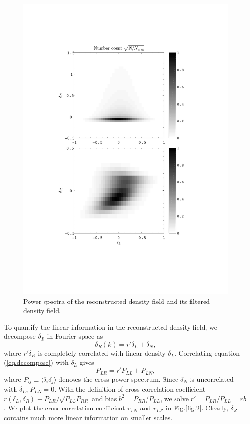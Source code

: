 \documentclass[aps,prd,twocolumn,superscriptaddress,amsfont,amssymb,amsmath,nofootinbib,showpacs,balancelastpage]{revtex4-1}
\begin{document}
\begin{figure}[t] \centering
  \includegraphics[width=1.0\linewidth]{pdfs.pdf}
  \caption{Power spectra of the reconstructed density field and its
  filtered density field.}
  \label{fig.4}
\end{figure}

To quantify the linear information in the reconstructed density field, we decompose $\delta_R$ in Fourier space as
\begin{equation}\label{eq.decompose}
    \delta_R(k)=r'\delta_L+\delta_N,
\end{equation}
where $r'\delta_R$ is completely correlated with linear density $\delta_L$. Correlating equation (\ref{eq.decompose}) with $\delta_L$ gives
\begin{equation}
    P_{LR}=r'P_{LL}+P_{LN},
\end{equation}
where $P_{ij}\equiv\langle\delta_i\delta_j\rangle$ denotes the cross power 
spectrum. Since $\delta_N$ is uncorrelated with $\delta_L$, $P_{LN}=0$. With the 
definition of cross correlation coefficient $r(\delta_L,\delta_R)\equiv P_{LR}/\sqrt{P_{LL}P_{RR}}$ 
and bias $b^2=P_{RR}/P_{LL}$, we solve $r'=P_{LR}/P_{LL}=rb$. We plot the cross 
correlation coefficient $r_{LN}$ and $r_{LR}$ in Fig.\ref{fig.2}. Clearly, $
\delta_R$ contains much more linear information on smaller scales.
\end{document}

